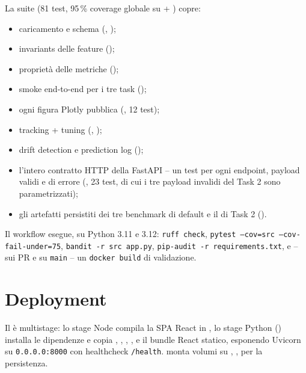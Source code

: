 La suite  (81 test, 95\,\% coverage globale su
 + ) copre:
\begin{itemize}
  \item caricamento e schema (,
        );
  \item invariants delle feature ();
  \item proprietà delle metriche ();
  \item smoke end-to-end per i tre task ();
  \item ogni figura Plotly pubblica (,
        12 test);
  \item tracking + tuning (,
        );
  \item drift detection e prediction log ();
  \item l'intero contratto HTTP della FastAPI -- un test per ogni
        endpoint, payload validi e di errore
        (, 23 test, di cui i tre payload
        invalidi del Task 2 sono parametrizzati);
  \item gli artefatti persistiti dei tre benchmark di default e il
         di Task 2
        ().
\end{itemize}

Il workflow  esegue, su Python 3.11 e
3.12: \texttt{ruff check}, \texttt{pytest --cov=src --cov-fail-under=75},
\texttt{bandit -r src app.py}, \texttt{pip-audit -r requirements.txt},
e -- sui PR e su \texttt{main} -- un \texttt{docker build} di
validazione.

\section{Deployment}

Il  è multistage: lo stage Node compila la SPA React in
, lo stage Python ()
installa le dipendenze e copia , ,
, ,  e il bundle
React statico, esponendo Uvicorn su \texttt{0.0.0.0:8000} con healthcheck
\texttt{/health}.  monta volumi su
, ,  per la persistenza.

